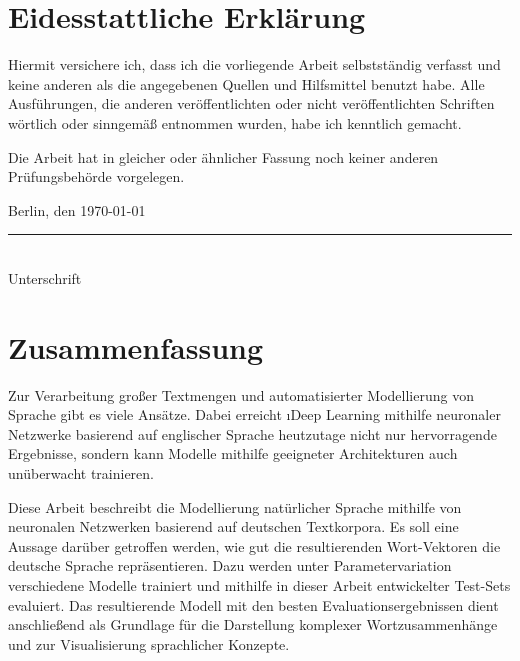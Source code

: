\BlankPage

\chapter*{Eidesstattliche Erklärung}
Hiermit versichere ich, dass ich die vorliegende Arbeit selbstständig verfasst und keine anderen als die angegebenen Quellen und Hilfsmittel benutzt habe. Alle Ausführungen, die anderen veröffentlichten oder nicht veröffentlichten Schriften wörtlich oder sinngemäß entnommen wurden, habe ich kenntlich gemacht.

Die Arbeit hat in gleicher oder ähnlicher Fassung noch keiner anderen Prüfungsbehörde vorgelegen.
\vspace{10mm}

Berlin, den \today\\

\vspace{1cm}
\rule{.5\textwidth}{.5pt}\\
Unterschrift

\BlankPage

\chapter*{Zusammenfassung}
Zur Verarbeitung großer Textmengen und automatisierter Modellierung von Sprache gibt es viele Ansätze. Dabei erreicht \i{Deep Learning} mithilfe neuronaler Netzwerke basierend auf englischer Sprache heutzutage nicht nur hervorragende Ergebnisse, sondern kann Modelle mithilfe geeigneter Architekturen auch unüberwacht trainieren.

Diese Arbeit beschreibt die Modellierung natürlicher Sprache mithilfe von neuronalen Netzwerken basierend auf deutschen Textkorpora. Es soll eine Aussage darüber getroffen werden, wie gut die resultierenden Wort-Vektoren die deutsche Sprache repräsentieren. Dazu werden unter Parametervariation verschiedene Modelle trainiert und mithilfe in dieser Arbeit entwickelter Test-Sets evaluiert. Das resultierende Modell mit den besten Evaluationsergebnissen dient anschließend als Grundlage für die Darstellung komplexer Wortzusammenhänge und zur Visualisierung sprachlicher Konzepte.\\

